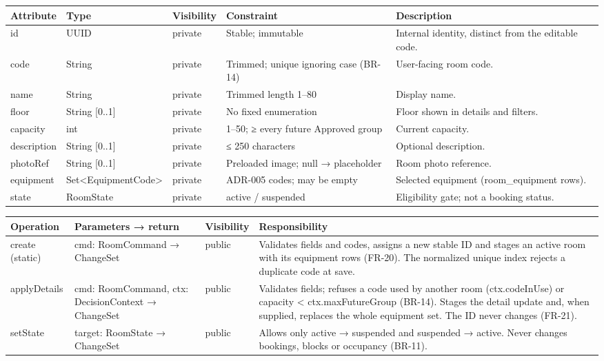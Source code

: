 \small
\setlength{\tabcolsep}{3pt}
\renewcommand{\arraystretch}{1.12}
\begin{longtable}{|p{}|p{}|p{}|p{}|p{}|}
\hline
\textbf{Attribute} & \textbf{Type} & \textbf{Visibility} & \textbf{Constraint} & \textbf{Description} \\ \hline
\endfirsthead \hline
id & UUID & private & Stable; immutable & Internal identity, distinct from the editable code. \\ \hline
code & String & private & Trimmed; unique ignoring case (BR-14) & User-facing room code. \\ \hline
name & String & private & Trimmed length 1–80 & Display name. \\ \hline
floor & String [0..1] & private & No fixed enumeration & Floor shown in details and filters. \\ \hline
capacity & int & private & 1–50; ≥ every future Approved group & Current capacity. \\ \hline
description & String [0..1] & private & ≤ 250 characters & Optional description. \\ \hline
photoRef & String [0..1] & private & Preloaded image; null → placeholder & Room photo reference. \\ \hline
equipment & Set<\allowbreak EquipmentCode> & private & ADR-005 codes; may be empty & Selected equipment (room\_equipment rows). \\ \hline
state & RoomState & private & active / suspended & Eligibility gate; not a booking status. \\ \hline
\end{longtable}
\normalsize

\small
\setlength{\tabcolsep}{3pt}
\renewcommand{\arraystretch}{1.12}
\begin{longtable}{|p{}|p{}|p{}|p{}|}
\hline
\textbf{Operation} & \textbf{Parameters → return} & \textbf{Visibility} & \textbf{Responsibility} \\ \hline
\endfirsthead \hline
create (static) & cmd: RoomCommand → ChangeSet & public & Validates fields and codes, assigns a new stable ID and stages an active room with its equipment rows (FR-20). The normalized unique index rejects a duplicate code at save. \\ \hline
applyDetails & cmd: RoomCommand, ctx: DecisionContext → ChangeSet & public & Validates fields; refuses a code used by another room (ctx.codeInUse) or capacity < ctx.maxFutureGroup (BR-14). Stages the detail update and, when supplied, replaces the whole equipment set. The ID never changes (FR-21). \\ \hline
setState & target: RoomState → ChangeSet & public & Allows only active → suspended and suspended → active. Never changes bookings, blocks or occupancy (BR-11). \\ \hline
\end{longtable}
\normalsize

